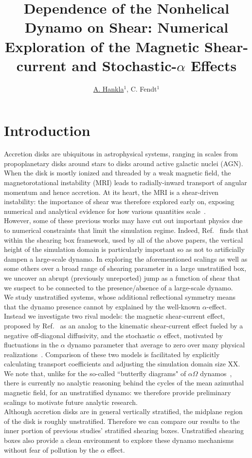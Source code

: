 \documentclass{epsconf}
\title{Dependence of the Nonhelical Dynamo on Shear: Numerical Exploration of the Magnetic Shear-current and Stochastic-$\alpha$ Effects}
\author{\underline{A. Hankla}$^1$, C. Fendt$^1$}
\institute{$^1$ Max Planck Institute for Astronomy, Heidelberg, Germany}
\begin{document}
\maketitle

\section{Introduction}
Accretion disks are ubiquitous in astrophysical systems, ranging in scales from propoplanetary disks around stars to disks around active galactic nuclei (AGN). When the disk is mostly ionized and threaded by a weak magnetic field, the magnetorotational instability (MRI) leads to radially-inward transport of angular momentum and hence accretion. At its heart, the MRI is a shear-driven instability: the importance of shear was therefore explored early on, exposing numerical and analytical evidence for how various quantities scale~\cite{abl96}.\\
%
However, some of these previous works may have cut out important physics due to numerical constraints that limit the simulation regime. Indeed, Ref.~\cite{SSH16} finds that within the shearing box framework, used by all of the above papers, the vertical height of the simulation domain is particularly important so as not to artificially dampen a large-scale dynamo. In exploring the aforementioned scalings as well as some others over a broad range of shearing parameter in a large unstratified box, we uncover an abrupt (previously unreported) jump as a function of shear that we suspect to be connected to the presence/absence of a large-scale dynamo. \\
%
We study unstratified systems, whose additional reflectional symmetry means that the dynamo presence cannot by explained by the well-known $\alpha$-effect. Instead we investigate two rival models: the magnetic shear-current effect, proposed by Ref.~\cite{SB16} as an analog to the kinematic shear-current effect fueled by a negative off-diagonal diffusivity, and the stochastic $\alpha$ effect, motivated by fluctuations in the $\alpha$ dynamo parameter that average to zero over many physical realizations~\cite{hms11}. Comparison of these two models is facilitated by explicitly calculating transport coefficients and adjusting the simulation domain size XX. We note that, unlike for the so-called ``butterfly diagrams" of $\alpha\Omega$ dynamos~\cite{GP15}, there is currently no analytic reasoning behind the cycles of the mean azimuthal magnetic field, for an unstratified dynamo: we therefore provide preliminary scalings to motivate future analytic research. \\
%
Although accretion disks are in general vertically stratified, the midplane region of the disk is roughly unstratified. Therefore we can compare our results to the inner portion of previous studies' stratified shearing boxes. Unstratified shearing boxes also provide a clean environment to explore these dynamo mechanisms without fear of pollution by the $\alpha$ effect.
\end{document}
